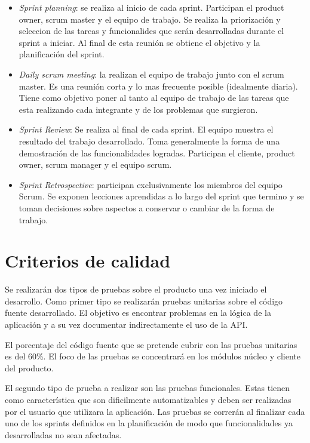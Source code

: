 \documentclass[12pt,a4paper]{article}
\begin{document}
	\begin{itemize}
	\item \textit{Sprint planning}: se realiza al inicio de cada sprint. Participan el product owner, scrum master y el equipo de trabajo. Se realiza la priorización y seleccion de las tareas y funcionalides que serán desarrolladas durante el sprint a iniciar. Al final de esta reunión se obtiene el objetivo y la planificación del sprint.

	\item \textit{Daily scrum meeting}: la realizan el equipo de trabajo junto con el scrum master. Es una reunión corta y lo mas frecuente posible (idealmente diaria).  Tiene como objetivo poner al tanto al equipo de trabajo de las tareas que esta realizando cada integrante y de los problemas que surgieron.

	\item \textit{Sprint Review}: Se realiza al final de cada sprint. El equipo muestra el resultado del trabajo desarrollado. Toma generalmente la forma de una demostración de las funcionalidades logradas. Participan el cliente, product owner, scrum manager y el equipo scrum.

	\item \textit{Sprint Retrospective}: participan exclusivamente los miembros del equipo Scrum. Se exponen lecciones aprendidas a lo largo del sprint que termino y se toman decisiones sobre aspectos a conservar o cambiar de la forma de trabajo.
	\end{itemize}
	\section{Criterios de calidad}
	
Se realizarán dos tipos de pruebas sobre el producto una vez iniciado el desarrollo. Como primer tipo se realizarán pruebas unitarias sobre el código fuente desarrollado. El objetivo es encontrar problemas en la lógica de la aplicación y a su vez documentar indirectamente el uso de la API.

	El porcentaje del código fuente que se pretende cubrir con las pruebas unitarias es del 60\%. El foco de las pruebas se concentrará en los módulos núcleo y cliente del producto.

	El segundo tipo de prueba a realizar son las pruebas funcionales. Estas tienen como característica que son dificilmente automatizables y deben ser realizadas por el usuario que utilizara la aplicación. Las pruebas se correrán al finalizar cada uno de los sprints definidos en la planificación de modo que funcionalidades ya desarrolladas no sean afectadas.
\end{document}
